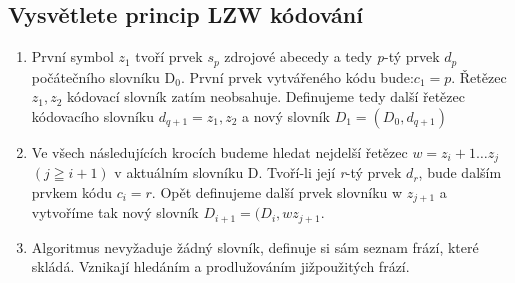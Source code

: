 \subsection{Vysvětlete princip LZW kódování}
\begin{enumerate}
    \item První symbol $z_1$ tvoří prvek $s_p$ zdrojové abecedy a tedy \emph{p}-tý prvek $d_p$ počátečního slovníku D$_0$.
    První prvek vytvářeného kódu bude:$c_1 = p$.
    Řetězec $z_1, z_2$ kódovací slovník zatím neobsahuje.
    Definujeme tedy další řetězec kódovacího slovníku $d_{q+1} = z_1, z_2$ a nový slovník $D_1=(D_0,d_{q+1}) $
    \item Ve všech následujících krocích budeme hledat nejdelší řetězec $w = z_i+1\dots z_j$ $(j\geqq i+1)$ v aktuálním slovníku D.
    Tvoří-li její \emph{r}-tý prvek $d_r$, bude dalším prvkem kódu $c_i=r$. 
    Opět definujeme další prvek slovníku w $z_{j+1}$ a vytvoříme tak nový slovník $D_{i+1} = (D_i, w\mathrm{ }z_{j+1}$.
    \item Algoritmus nevyžaduje žádný slovník, definuje si sám seznam frází, které skládá. Vznikají hledáním a prodlužováním jižpoužitých frází.
\end{enumerate}
